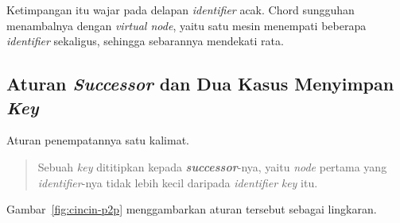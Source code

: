 Ketimpangan itu wajar pada delapan \textit{identifier} acak. Chord sungguhan menambalnya
dengan \textit{virtual node}, yaitu satu mesin menempati beberapa \textit{identifier}
sekaligus, sehingga sebarannya mendekati rata.

\subsection{Aturan \textit{Successor} dan Dua Kasus Menyimpan \textit{Key}}

Aturan penempatannya satu kalimat.

\begin{quote}
  Sebuah \textit{key} dititipkan kepada \textbf{\textit{successor}}-nya, yaitu \textit{node}
  pertama yang \textit{identifier}-nya tidak lebih kecil daripada \textit{identifier} \textit{key} itu.
\end{quote}

Gambar~\ref{fig:cincin-p2p} menggambarkan aturan tersebut sebagai lingkaran.

